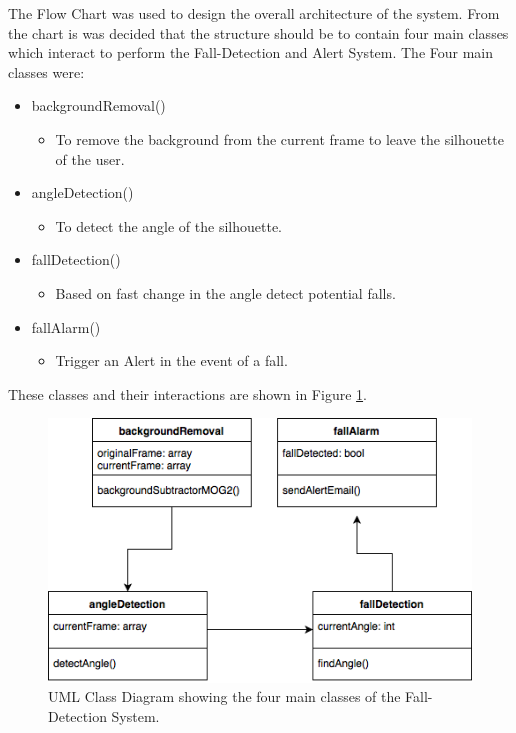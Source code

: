 \documentclass[11pt,a4paper]{report}
\begin{document}
\pagebreak
\noindent
The Flow Chart was used to design the overall architecture of the system. From the chart is was decided that the structure should be to contain four main classes which interact to perform the Fall-Detection and Alert System. The Four main classes were:
\begin{itemize}
\item backgroundRemoval()
	\begin{itemize}
	\item To remove the background from the current frame to leave the silhouette of the user.
	\end{itemize}
\item angleDetection()
	\begin{itemize}
	\item To detect the angle of the silhouette.
	\end{itemize}
\item fallDetection()
	\begin{itemize}
	\item Based on fast change in the angle detect potential falls.
	\end{itemize}
\item fallAlarm()
	\begin{itemize}
	\item Trigger an Alert in the event of a fall.
	\end{itemize}
\end{itemize}

These classes and their interactions are shown in Figure \ref{fig:UMLClassDiagram}.

\begin{figure}[H]
 \centering
 \includegraphics[scale = 0.5]{UMLClassDiagram.png}
 \caption{UML Class Diagram showing the four main classes of the Fall-Detection System.}
 \label{fig:UMLClassDiagram}
\end{figure}
\end{document}
